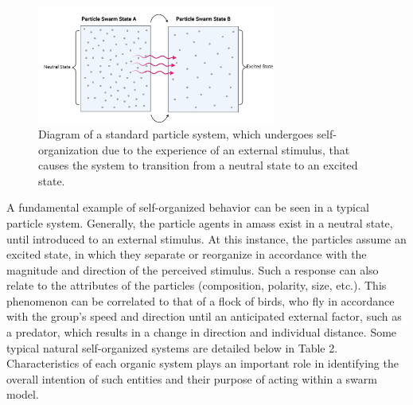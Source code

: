 \begin{figure}[!h]
  \centering
  \includegraphics[width=0.7\textwidth]{particles.jpg}
  \caption{Diagram of a standard particle system, which undergoes self-organization due to the experience of an external stimulus, that causes the system to transition from a neutral state to an excited state. }
  \label{fig:platforms}
\end{figure}

A fundamental example of self-organized behavior can be seen in a typical particle system. Generally, the particle agents in amass exist in a neutral state, until introduced to an external stimulus. At this instance, the particles assume an excited state, in which they separate or reorganize in accordance with the magnitude and direction of the perceived stimulus. Such a response can also relate to the attributes of the particles (composition, polarity, size, etc.). This phenomenon can be correlated to that of a flock of birds, who fly in accordance with the group’s speed and direction until an anticipated external factor, such as a predator, which results in a change in direction and individual distance. Some typical natural self-organized systems are detailed below in Table 2. Characteristics of each organic system plays an important role in identifying the overall intention of such entities and their purpose of acting within a swarm model.

